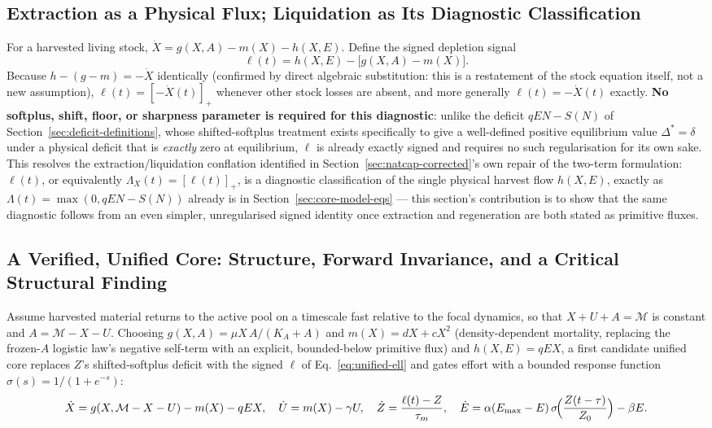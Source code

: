 \documentclass[twocolumn,10pt]{article}
\begin{document}
\subsection{Extraction as a Physical Flux; Liquidation as Its Diagnostic Classification}
\label{sec:unified-liquidation}
For a harvested living stock, $\dot X = g(X,A)-m(X)-h(X,E)$. Define the signed depletion signal
\begin{equation}
\ell(t) = h(X,E) - \bigl[g(X,A)-m(X)\bigr].
\label{eq:unified-ell}
\end{equation}
Because $h-(g-m)=-\dot X$ identically (confirmed by direct algebraic substitution: this is a restatement of the stock equation itself, not a new assumption), $\ell(t)=[-\dot X(t)]_+$ whenever other stock losses are absent, and more generally $\ell(t)=-\dot X(t)$ exactly. \textbf{No softplus, shift, floor, or sharpness parameter is required for this diagnostic}: unlike the deficit $qEN-S(N)$ of Section~\ref{sec:deficit-definitions}, whose shifted-softplus treatment exists specifically to give a well-defined positive equilibrium value $\Delta^*=\delta$ under a physical deficit that is \emph{exactly} zero at equilibrium, $\ell$ is already exactly signed and requires no such regularisation for its own sake. This resolves the extraction/liquidation conflation identified in Section~\ref{sec:natcap-corrected}'s own repair of the two-term formulation: $\ell(t)$, or equivalently $\Lambda_X(t)=[\ell(t)]_+$, is a diagnostic classification of the single physical harvest flow $h(X,E)$, exactly as $\Lambda(t)=\max(0,qEN-S(N))$ already is in Section~\ref{sec:core-model-eqs} --- this section's contribution is to show that the same diagnostic follows from an even simpler, unregularised signed identity once extraction and regeneration are both stated as primitive fluxes.

\subsection{A Verified, Unified Core: Structure, Forward Invariance, and a Critical Structural Finding}
\label{sec:unified-core-model}
Assume harvested material returns to the active pool on a timescale fast relative to the focal dynamics, so that $X+U+A=\mathcal M$ is constant and $A=\mathcal M-X-U$. Choosing $g(X,A)=\mu X\,A/(K_A+A)$ and $m(X)=dX+cX^2$ (density-dependent mortality, replacing the frozen-$A$ logistic law's negative self-term with an explicit, bounded-below primitive flux) and $h(X,E)=qEX$, a first candidate unified core replaces $Z$'s shifted-softplus deficit with the signed $\ell$ of Eq.~\eqref{eq:unified-ell} and gates effort with a bounded response function $\sigma(s)=1/(1+e^{-s})$:
\begin{equation}
\dot X = g(X,\mathcal M-X-U)-m(X)-qEX,\quad
\dot U = m(X)-\gamma U,\quad
\dot Z = \frac{\ell(t)-Z}{\tau_m},\quad
\dot E = \alpha(E_{\max}-E)\,\sigma\!\Bigl(\frac{Z(t-\tau)}{Z_0}\Bigr)-\beta E.
\label{eq:unified-core-v1}
\end{equation}
\end{document}
